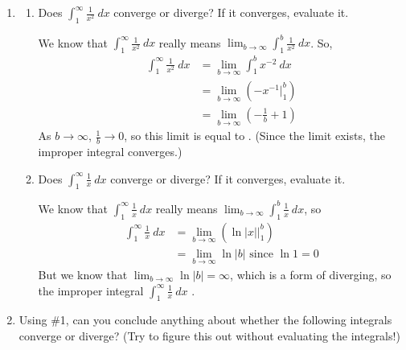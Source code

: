 \documentclass[main]{subfiles}
\begin{document}
\begin{enumerate}
  \item 
  \begin{enumerate}
    \item
    \begin{problem}[2.5in]
    Does $\displaystyle \int_1^\infty \frac{1}{x^2}~dx$ converge or
    diverge?  If it converges, evaluate it.
    \end{problem}

    \begin{solution}
    We know that $\displaystyle \int_1^\infty \frac{1}{x^2}~dx$ really
    means $\displaystyle \lim_{b \to \infty} \int_1^b \frac{1}{x^2}~dx$.
    So, 
    \begin{align*}
    \int_1^\infty \frac{1}{x^2}~dx & = \lim_{b \to \infty} \int_1^b
    x^{-2}~dx \\
    & = \lim_{b \to \infty} \left( -x^{-1} \Big|_1^b
    \right) \\
    & = \lim_{b \to \infty} \left( -\frac{1}{b} + 1 \right)
\end{align*}
As $b \to \infty$, $\frac{1}{b} \to 0$, so this limit is equal to
.  (Since the limit exists, the improper integral
converges.)
\end{solution}

\item
\begin{problem}[2.5in]
Does $\displaystyle \int_1^\infty \frac{1}{x}~dx$ converge or
diverge?  If it converges, evaluate it.
\end{problem}

\begin{solution}
We know that $\displaystyle \int_1^\infty \frac{1}{x}~dx$ really
means $\displaystyle \lim_{b \to \infty} \int_1^b \frac{1}{x}~dx$, so
\begin{align*}
\int_1^\infty \frac{1}{x}~dx & = \lim_{b \to \infty}
\left( \ln |x| \Big|_1^b \right) \\
& = \lim_{b \to \infty} \ln |b| \textrm{ since } \ln 1 = 0
\end{align*}
But we know that $\displaystyle \lim_{b \to \infty} \ln |b| =
\infty$, which is a form of diverging, so the improper integral
$\displaystyle \int_1^\infty \frac{1}{x}~dx$ .
\end{solution}
\end{enumerate}

\pspace{\newpage}
\item 
Using {\#1}, can you conclude anything about whether
the following integrals converge or diverge?  (Try to figure this out
without evaluating the integrals!)


\end{enumerate}
\end{document}

